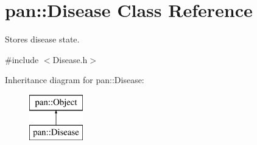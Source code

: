 \hypertarget{classpan_1_1_disease}{}\section{pan\+:\+:Disease Class Reference}
\label{classpan_1_1_disease}


Stores disease state.  




{\ttfamily \#include $<$Disease.\+h$>$}

Inheritance diagram for pan\+:\+:Disease\+:\begin{figure}[H]
\begin{center}
\leavevmode
\includegraphics[height=2.000000cm]{classpan_1_1_disease}
\end{center}
\end{figure}
